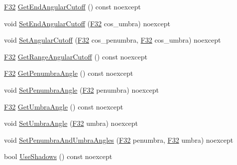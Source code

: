 \begin{DoxyCompactItemize}
\item 
\mbox{\hyperlink{namespacemage_aa97e833b45f06d60a0a9c4fc22ae02c0}{F32}} \mbox{\hyperlink{classmage_1_1rendering_1_1_spot_light_aab94a7a9d5434d8e7913d7b52379841b}{Get\+End\+Angular\+Cutoff}} () const noexcept
\item 
void \mbox{\hyperlink{classmage_1_1rendering_1_1_spot_light_a39c94841a3f839dd05f387fc87722f00}{Set\+End\+Angular\+Cutoff}} (\mbox{\hyperlink{namespacemage_aa97e833b45f06d60a0a9c4fc22ae02c0}{F32}} cos\+\_\+umbra) noexcept
\item 
void \mbox{\hyperlink{classmage_1_1rendering_1_1_spot_light_a92a3b92e8a789c038c0f9058b1ff5a48}{Set\+Angular\+Cutoff}} (\mbox{\hyperlink{namespacemage_aa97e833b45f06d60a0a9c4fc22ae02c0}{F32}} cos\+\_\+penumbra, \mbox{\hyperlink{namespacemage_aa97e833b45f06d60a0a9c4fc22ae02c0}{F32}} cos\+\_\+umbra) noexcept
\item 
\mbox{\hyperlink{namespacemage_aa97e833b45f06d60a0a9c4fc22ae02c0}{F32}} \mbox{\hyperlink{classmage_1_1rendering_1_1_spot_light_abd442757ce094619b8f4c050e54403e1}{Get\+Range\+Angular\+Cutoff}} () const noexcept
\item 
\mbox{\hyperlink{namespacemage_aa97e833b45f06d60a0a9c4fc22ae02c0}{F32}} \mbox{\hyperlink{classmage_1_1rendering_1_1_spot_light_a17d63e6f944d83eaca821476de70d5bc}{Get\+Penumbra\+Angle}} () const noexcept
\item 
void \mbox{\hyperlink{classmage_1_1rendering_1_1_spot_light_a8dac22c53c71001a6c43ab2a34ace206}{Set\+Penumbra\+Angle}} (\mbox{\hyperlink{namespacemage_aa97e833b45f06d60a0a9c4fc22ae02c0}{F32}} penumbra) noexcept
\item 
\mbox{\hyperlink{namespacemage_aa97e833b45f06d60a0a9c4fc22ae02c0}{F32}} \mbox{\hyperlink{classmage_1_1rendering_1_1_spot_light_a2ad4020c60fcfd2fca7568fbefa601f0}{Get\+Umbra\+Angle}} () const noexcept
\item 
void \mbox{\hyperlink{classmage_1_1rendering_1_1_spot_light_a65c753804a53c6b9fc1c58bf036a75c1}{Set\+Umbra\+Angle}} (\mbox{\hyperlink{namespacemage_aa97e833b45f06d60a0a9c4fc22ae02c0}{F32}} umbra) noexcept
\item 
void \mbox{\hyperlink{classmage_1_1rendering_1_1_spot_light_aa2e2c75dabaf5d33141d9b8a1163f317}{Set\+Penumbra\+And\+Umbra\+Angles}} (\mbox{\hyperlink{namespacemage_aa97e833b45f06d60a0a9c4fc22ae02c0}{F32}} penumbra, \mbox{\hyperlink{namespacemage_aa97e833b45f06d60a0a9c4fc22ae02c0}{F32}} umbra) noexcept
\item 
bool \mbox{\hyperlink{classmage_1_1rendering_1_1_spot_light_a5081e3b99bd869d6c241b48666917cd4}{Use\+Shadows}} () const noexcept

\end{DoxyCompactItemize}

